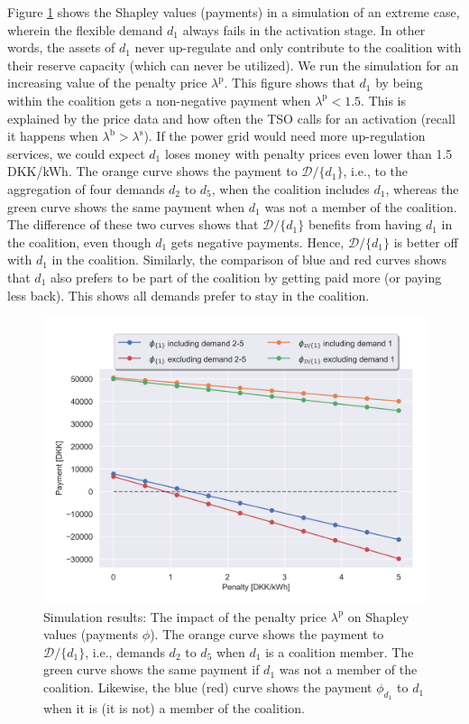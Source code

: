 \documentclass[conference]{IEEEtran}
\begin{document}
Figure \ref{fig:shapley_values} shows the Shapley values (payments) in a simulation of an extreme case, wherein the flexible demand $d_1$ always fails in the activation stage. In other words, the assets of $d_1$ never up-regulate and only contribute to the coalition with their reserve capacity (which can never be utilized). We run the simulation for an increasing value of the penalty price $\lambda^{\text{p}}$.
This figure shows that $d_1$ by being within the coalition gets a non-negative payment when $\lambda^{\text{p}} < 1.5$. This is explained by the price data and how often the TSO calls for an activation (recall it happens when $\lambda^{\text{b}} > \lambda^{\text{s}}$). If the power grid would need more up-regulation services, we could expect $d_1$ loses money with penalty prices even lower than 1.5 DKK/kWh. The orange curve shows the payment to $\mathcal{D} / \{d_1\}$, i.e., to the aggregation of four demands $d_2$ to $d_5$, when the coalition includes $d_1$, whereas the green curve shows the same payment when $d_1$ was not a member of the coalition. The difference of these two curves shows that $\mathcal{D} / \{d_1\}$ benefits from having $d_1$ in the coalition, even though $d_1$ gets negative payments. Hence, $\mathcal{D} / \{d_1\}$ is better off with $d_1$ in the coalition.
Similarly, the comparison of blue and red curves shows that $d_1$ also prefers to be part of the coalition by getting paid more (or paying less back). This shows all demands prefer to stay in the coalition.



\begin{figure}[!t]
    \centering
    \includegraphics[width=\columnwidth]{figures/shapley_values.png}
    \caption{Simulation results: The impact of the penalty price $\lambda^{\text{p}}$ on
        Shapley values (payments $\phi$). The orange curve shows the payment  to $\mathcal{D} / \{d_1\}$, i.e., demands $d_2$ to $d_5$ when $d_1$ is a coalition member. The green curve shows the same payment if $d_1$ was not a member of the coalition. Likewise, the blue (red) curve shows the payment $\phi_{d_1}$ to $d_1$ when it is (it is not) a member of the coalition.}
    \label{fig:shapley_values}
\end{figure}
\end{document}
